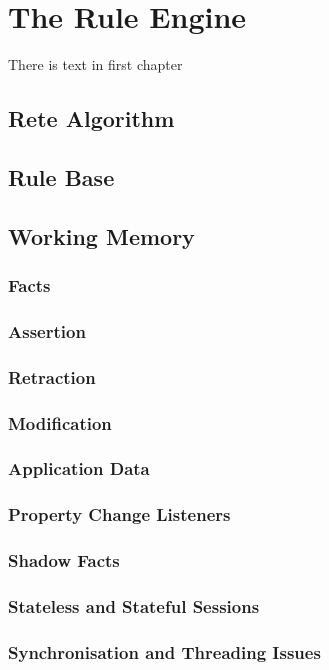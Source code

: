 \chapter{The Rule Engine}
There is text in first chapter

\section{Rete Algorithm}

\section{Rule Base}

\section{Working Memory}
\subsection{Facts}
\subsection{Assertion}
\subsection{Retraction}
\subsection{Modification}
\subsection{Application Data}
\subsection{Property Change Listeners}
\subsection{Shadow Facts}
\subsection{Stateless and Stateful Sessions}
\subsection{Synchronisation and Threading Issues}

